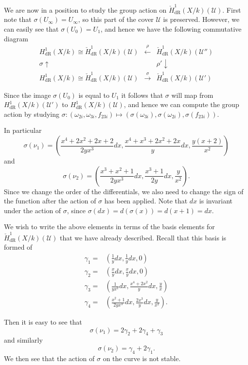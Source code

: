 \documentclass[draft, 11pt]{article} %
\theoremstyle{plain}
\theoremstyle{remark}
\newcommand{\cU}{{\mathcal U}}
\newcommand{\derhamhone}{H_{\text {dR}}^1(X/k)}
\newcommand{\cechderhamhone}{\check{H}_{\text {dR}}^1(X/k)}
\begin{document}
We are now in a position to study the group action on $\cechderhamhone(\cU)$.
First note that $\sigma(U_\infty) = U_\infty$, so this part of the cover $\cU$ is preserved.
However, we can easily see that $\sigma(U_0) = U_1$, and hence we have the following commutative diagram
\[
\begin{array}{ccc}
\derhamhone \cong \cechderhamhone(\cU)  & \xleftarrow{\rho} & \cechderhamhone(\cU'')  \\
\sigma\uparrow & ~ & \rho'\downarrow  \\
\derhamhone \cong \cechderhamhone(\cU)  & \xrightarrow{\sigma} & \cechderhamhone(\cU')
\end{array}
\]

Since the image $\sigma (U_0)$ is equal to $U_1$ it follows that $\sigma$ will map from $\derhamhone(\cU')$ to $\derhamhone(\cU)$, and hence we can compute the group action by studying $\sigma \colon (\omega_{2i}, \omega_{3i}, f_{23i}) \mapsto (\sigma(\omega_{3i}), \sigma (\omega_{2i}), \sigma(f_{23i}))$.

In particular
\begin{equation}\label{sigmanu1}
\sigma(\nu_1) = \left( \frac{x^4+2x^2+2x+2}{2yx^3}dx, \frac{x^4+x^3+2x^2+2x}{y}dx, \frac{y(x+2)}{x^2} \right)
\end{equation}
and
\[
\sigma(\nu_2) = \left( \frac{x^3+x^2+1}{2yx^3}dx, \frac{x^3+1}{2y}dx, \frac{y}{x^2} \right).
\]
Since we change the order of the differentials, we also need to change the sign of the function after the action of $\sigma$ has been applied.
Note that $dx$ is invariant under the action of $\sigma$, since $\sigma(dx) = d (\sigma (x)) = d(x+1) = dx$.



We wish to write the above elements in terms of the basis elements for $\cechderhamhone(\cU)$ that we have already described.
Recall that this basis is formed of
\begin{align}
\gamma_1  = & \left( \frac{1}{y}dx, \frac{1}{y}dx, 0\right) \\
\gamma_2 = & \left(\frac{x}{y}dx, \frac{x}{y}dx, 0\right) \\
\gamma_3 = & \left( \frac{1}{yx^2}dx, \frac{x^4 + 2x^2}{y}dx, \frac{y}{x} \right)\\
\gamma_4 = & \left(\frac{x^2+1}{2yx^3}dx, \frac{2x^3}{y}dx, \frac{y}{x^2} \right).
\end{align}

Then it is easy to see that
\[
\sigma(\nu_1) = 2 \gamma_2 + 2\gamma_4 + \gamma_3
\]
and similarly
\[
\sigma(\nu_2) = \gamma_4 + 2 \gamma_1.
\]
We then see that the action of $\sigma$ on the curve is not stable.
\end{document}
